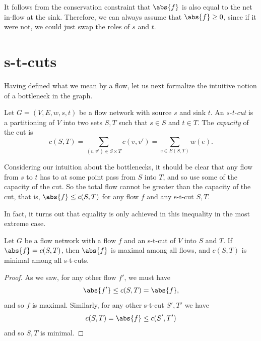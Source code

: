 \documentclass[nobib]{tufte-handout}
\begin{document}
\begin{remark}
    It follows from the conservation constraint that $\abs{f}$ is also equal to the net in-flow at the sink. Therefore, we can always assume that $\abs{f} \geq 0$, since if it were not, we could just swap the roles of $s$ and $t$.
\end{remark}

\section{s-t-cuts}

Having defined what we mean by a flow, let us next formalize the intuitive notion of a bottleneck in the graph.

\begin{definition}
    Let $G = (V,E,w,s,t)$ be a flow network with source $s$ and sink $t$. An \emph{s-t-cut} is a partitioning of $V$ into two sets $S, T$ such that $s \in S$ and $t \in T$. The \emph{capacity} of the cut is
    $$c(S,T) = \sum_{(v,v') \in S \times T} c(v,v') = \sum_{e \in E(S,T)} w(e).$$
\end{definition}

Considering our intuition about the bottlenecks, it should be clear that any flow from $s$ to $t$ has to at some point pass from $S$ into $T$, and so use some of the capacity of the cut. So the total flow cannot be greater than the capacity of the cut, that is, $\abs{f} \leq c(S,T)$ for any flow $f$ and any s-t-cut $S,T$.

In fact, it turns out that equality is only achieved in this inequality in the most extreme case.

\begin{lemma}\label{lemma:cut_equals_flowvalue_implies_maximal}
    Let $G$ be a flow network with a flow $f$ and an s-t-cut of $V$ into $S$ and $T$. If $\abs{f} = c(S,T)$, then $\abs{f}$ is maximal among all flows, and $c(S,T)$ is minimal among all s-t-cuts.

    \begin{proof}
        As we saw, for any other flow $f'$, we must have 
        $$\abs{f'} \leq c(S,T) = \abs{f},$$
        and so $f$ is maximal. Similarly, for any other s-t-cut $S', T'$ we have
        $$c(S,T) = \abs{f} \leq c(S',T')$$
        and so $S, T$ is minimal.
    \end{proof}
\end{lemma}
\end{document}
